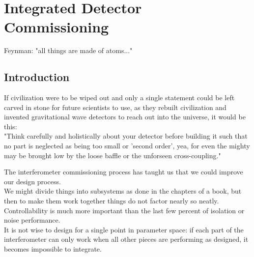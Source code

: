 \chapter[Integrated Detector Commissioning]{Integrated Detector Commissioning}
\label{IDC}


Feynman: "all things are made of atoms..."


\section{Introduction}
\label{sec7.1}
If civilization were to be wiped out and only a single statement could be left
carved in stone for future scientists to use, as they rebuilt civilization and
invented gravitational wave detectors to reach out into the universe,
it would be this:\\

"Think carefully and holistically about your detector before building it
such that no part is neglected as being too small or 'second order', yea,
for even the mighty may be brought low by the loose baffle or the
unforseen cross-coupling."

The interferometer commissioning process has taught us that we could improve our design process.\\

We might divide things into subsystems as done in the chapters of a book,
but then to make them work together things do not factor nearly so neatly.
Controllability is much more important than the last few percent of
isolation or noise performance.\\

It is not wise to design for a single point in parameter space: if each
part of the interferometer can only work when all other pieces are
performing as designed, it becomes impossible to integrate.\\

